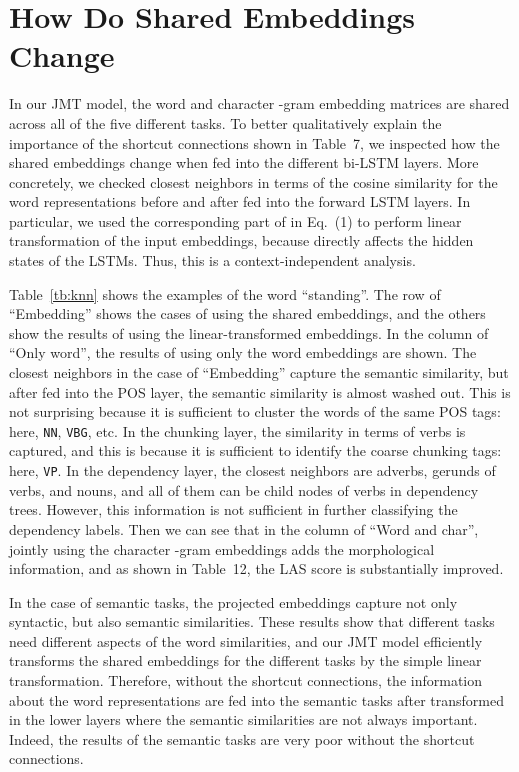 \documentclass[11pt,a4paper]{article}
\begin{document}
\section{How Do Shared Embeddings Change}
\label{sec:change}

In our JMT model, the word and character -gram embedding matrices are shared across all of the five different tasks.
To better qualitatively explain the importance of the shortcut connections shown in Table~7, we inspected how the shared embeddings change when fed into the different bi-LSTM layers.
More concretely, we checked closest neighbors in terms of the cosine similarity for the word representations before and after fed into the forward LSTM layers.
In particular, we used the corresponding part of  in Eq.~(1) to perform linear transformation of the input embeddings, because  directly affects the hidden states of the LSTMs.
Thus, this is a context-independent analysis.

Table~\ref{tb:knn} shows the examples of the word ``standing''.
The row of ``Embedding'' shows the cases of using the shared embeddings, and the others show the results of using the linear-transformed embeddings.
In the column of ``Only word'', the results of using only the word embeddings are shown.
The closest neighbors in the case of ``Embedding'' capture the semantic similarity, but after fed into the POS layer, the semantic similarity is almost washed out.
This is not surprising because it is sufficient to cluster the words of the same POS tags: here, {\tt NN}, {\tt VBG}, etc.
In the chunking layer, the similarity in terms of verbs is captured, and this is because it is sufficient to identify the coarse chunking tags: here, {\tt VP}.
In the dependency layer, the closest neighbors are adverbs, gerunds of verbs, and nouns, and all of them can be child nodes of verbs in dependency trees.
However, this information is not sufficient in further classifying the dependency labels.
Then we can see that in the column of ``Word and char'', jointly using the character -gram embeddings adds the morphological information, and as shown in Table~12, the LAS score is substantially improved.

In the case of semantic tasks, the projected embeddings capture not only syntactic, but also semantic similarities.
These results show that different tasks need different aspects of the word similarities, and our JMT model efficiently transforms the shared embeddings for the different tasks by the simple linear transformation.
Therefore, without the shortcut connections, the information about the word representations are fed into the semantic tasks after transformed in the lower layers where the semantic similarities are not always important.
Indeed, the results of the semantic tasks are very poor without the shortcut connections.
\end{document}
